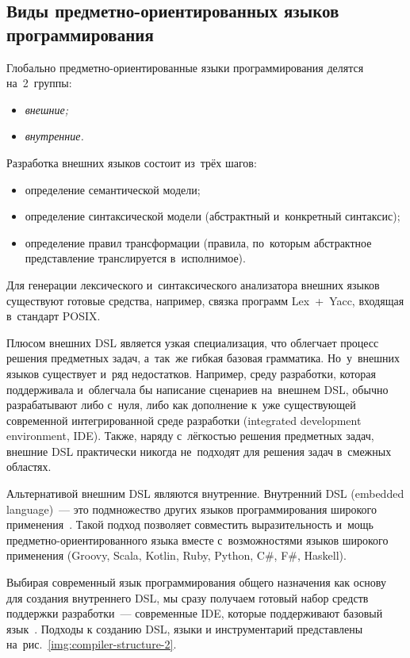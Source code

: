 \subsection{Виды предметно-ориентированных языков программирования} \label{sub122}
Глобально предметно-ориентированные языки программирования делятся на~2~группы: 
\begin{itemize} 
	\item{\textit{внешние;}}
	\item{\textit{внутренние.}}
\end{itemize}

Разработка внешних языков состоит из~трёх шагов:

\begin{itemize} 
	\item{определение семантической модели;}
	\item{определение синтаксической модели (абстрактный и~конкретный синтаксис);}
	\item{определение правил трансформации (правила, по~которым абстрактное представление транслируется в~исполнимое).}
\end{itemize}

Для генерации лексического и~синтаксического анализатора внешних языков существуют готовые средства, например, связка программ Lex~+~Yacc, входящая в~стандарт POSIX. 

Плюсом внешних DSL является узкая специализация, что облегчает процесс решения предметных задач, а~так~же гибкая базовая грамматика. Но~у~внешних языков существует и~ряд недостатков. Например, среду разработки, которая поддерживала и~облегчала бы написание сценариев на~внешнем
DSL, обычно разрабатывают либо с~нуля, либо как
дополнение к~уже существующей современной интегрированной среде разработки (integrated
development environment, IDE). Также, наряду с~лёгкостью решения предметных задач, внешние DSL практически никогда не~подходят для решения задач в~смежных областях.

Альтернативой внешним DSL являются внутренние. Внутренний DSL (embedded language)~--- это подмножество других языков программирования широкого применения~\cite{VanDeursen2000}. Такой подход позволяет совместить выразительность и~мощь предметно-ориентированного языка вместе с~возможностями языков широкого применения (Groovy, Scala, Kotlin, Ruby, Python, C\#, F\#, Haskell). 

Выбирая современный язык программирования общего назначения как основу для создания
внутреннего DSL, мы сразу получаем готовый
набор средств поддержки разработки~--- современные IDE, которые поддерживают базовый язык~\cite{Botov}. Подходы к созданию DSL, языки и инструментарий представлены на~рис.~\ref{img:compiler-structure-2}.

